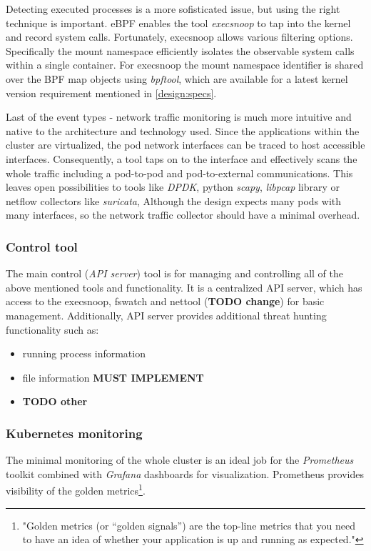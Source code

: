 Detecting executed processes is a more sofisticated issue, but using the right technique is important. eBPF enables the tool \textit{execsnoop} to tap into the kernel and record system calls. Fortunately, execsnoop allows various filtering options. Specifically the mount namespace efficiently isolates the observable system calls within a single container. For execsnoop the mount namespace identifier is shared over the BPF map objects using \textit{bpftool}, which are available for a latest kernel version requirement mentioned in \autoref{design:specs}.

Last of the event types - network traffic monitoring is much more intuitive and native to the architecture and technology used. Since the applications within the cluster are virtualized, the pod network interfaces can be traced to host accessible interfaces. Consequently, a tool taps on to the interface and effectively scans the whole traffic including a pod-to-pod and pod-to-external communications. This leaves open possibilities to tools like \textit{DPDK}, python \textit{scapy}, \textit{libpcap} library or netflow collectors like \textit{suricata}, Although the design expects many pods with many interfaces, so the network traffic collector should have a minimal overhead. %

\subsubsection*{Control tool \label{design:mon:tools:main}}
The main control (\textit{API server}) tool is for managing and controlling all of the above mentioned tools and functionality. It is a centralized API server, which has access to the execsnoop, fswatch and nettool (\textbf{TODO change}) for basic management. Additionally, API server provides additional threat hunting functionality such as:
\begin{itemize}[noitemsep]
	\item running process information
	\item file information \textbf{MUST IMPLEMENT}
	\item \textbf{TODO other}
\end{itemize}

\subsubsection*{Kubernetes monitoring \label{design:mon:tools:k8s}}
The minimal monitoring of the whole cluster is an ideal job for the \textit{Prometheus} toolkit combined with \textit{Grafana} dashboards for visualization. Prometheus provides visibility of the golden metrics\footnote{"Golden metrics (or “golden signals”) are the top-line metrics that you need to have an idea of whether your application is up and running as expected."\cite{goldenmetrics}}.

